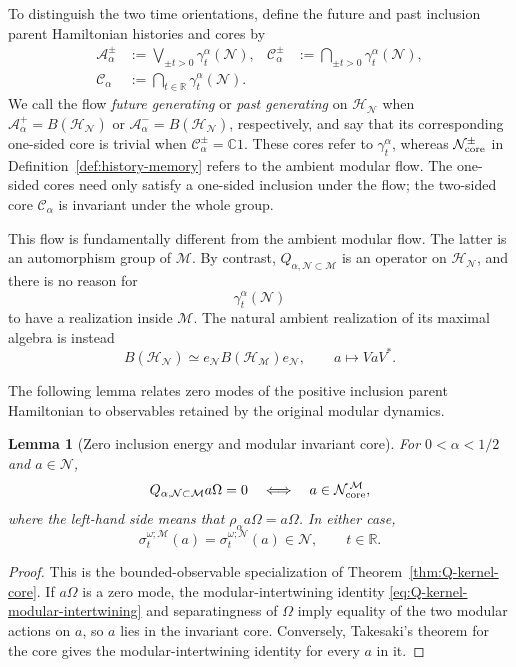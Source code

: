 \documentclass[a4paper,11pt]{article}
\newtheorem{lemma}[theorem]{Lemma}
\theoremstyle{definition}
\newcommand{\nn}{\nonumber}
\newcommand{\mN}{\mathcal{N}}
\newcommand{\mH}{\mathcal{H}}
\newcommand{\mM}{\mathcal{M}}
\begin{document}
To distinguish the two time orientations, define the future and past
inclusion parent Hamiltonian histories and cores by
\begin{align}
    \mathcal A_\alpha^\pm
    &:=\bigvee_{\pm t>0}\gamma_t^\alpha(\mN),
    &
    \mathcal C_\alpha^\pm
    &:=\bigcap_{\pm t>0}\gamma_t^\alpha(\mN),\nn\\
    \mathcal C_\alpha
    &:=\bigcap_{t\in\mathbb R}\gamma_t^\alpha(\mN).
    \label{eq:Halpha-one-sided-histories-cores}
\end{align}
We call the flow \emph{future generating} or \emph{past generating} on
$\mH_{\mN}$ when $\mathcal A_\alpha^+=B(\mH_{\mN})$ or
$\mathcal A_\alpha^-=B(\mH_{\mN})$, respectively, and say that its
corresponding one-sided core is trivial when
$\mathcal C_\alpha^\pm=\mathbb C1$. These cores refer to
$\gamma_t^\alpha$, whereas $\mN_{\rm core}^{\pm}$ in
Definition~\ref{def:history-memory} refers to the ambient modular flow.
The one-sided cores need only satisfy a one-sided inclusion under the
flow; the two-sided core $\mathcal C_\alpha$ is invariant under the
whole group.

This flow is fundamentally different from the ambient modular flow.
The latter is an automorphism group of $\mM$. By contrast,
$Q_{\alpha,\mN\subset\mM}$ is an operator on $\mH_{\mN}$, and there is
no reason for
\begin{equation}
    \gamma_t^\alpha(\mN)
\end{equation}
to have a realization inside $\mM$. The natural ambient realization
of its maximal algebra is instead
\begin{equation}
    B(\mH_{\mN})
    \simeq
    e_{\mN}B(\mH_{\mM})e_{\mN},
    \qquad
    a\longmapsto VaV^* .
    \label{eq:BHN-corner}
\end{equation}

The following lemma relates zero modes of the positive inclusion parent Hamiltonian
to observables retained by the original modular dynamics.

\begin{lemma}[Zero inclusion energy and modular invariant core]
\label{lem:zero-energy-modular-memory}
For $0<\alpha<1/2$ and $a\in\mN$,
\begin{equation}
 Q_{\alpha,\mN\subset\mM}a\Omega=0
 \quad\Longleftrightarrow\quad
 a\in\mN_{\rm core}^{\,\mM},
 \label{eq:Halpha-zero-a}
\end{equation}
where the left-hand side means that $\rho_\alpha a\Omega=a\Omega$.
In either case,
\begin{equation}
 \sigma_t^{\omega;\mM}(a)
 =\sigma_t^{\omega;\mN}(a)\in\mN,
 \qquad t\in\mathbb R.
 \label{eq:zero-energy-intertwining}
\end{equation}
\end{lemma}
\begin{proof}
This is the bounded-observable specialization of
Theorem~\ref{thm:Q-kernel-core}. If $a\Omega$ is a zero mode, the
modular-intertwining identity \eqref{eq:Q-kernel-modular-intertwining}
and separatingness of $\Omega$ imply equality of the two modular
actions on $a$, so $a$ lies in the invariant core. Conversely,
Takesaki's theorem for the core gives the modular-intertwining
identity for every $a$ in it.
\end{proof}
\end{document}
